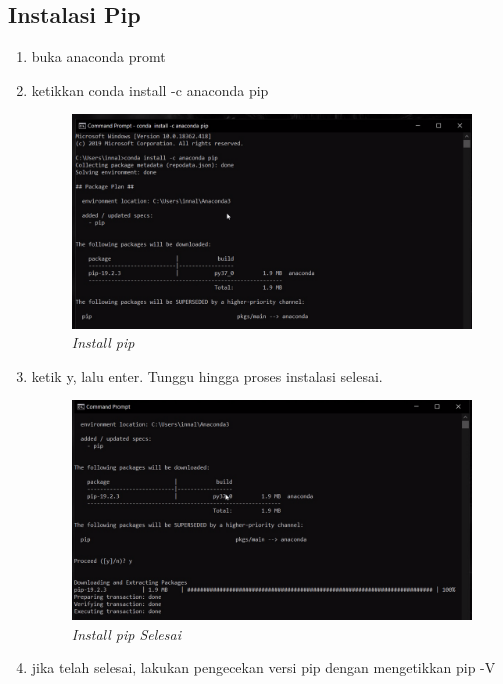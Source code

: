 \subsection{Instalasi Pip}
\begin{enumerate}
\item buka anaconda promt
\item ketikkan conda install -c anaconda pip
\begin{figure}[H]
    \centering
    \includegraphics[scale=0.5]{figures/installpip}
    \caption{\textit{Install pip}}
    \label{Figureanaconda70}
\end{figure}
\item ketik y, lalu enter. Tunggu hingga proses instalasi selesai.
\begin{figure}[H]
    \centering
    \includegraphics[scale=0.5]{figures/pipselesai}
    \caption{\textit{Install pip Selesai}}
    \label{Figureanaconda70}
\end{figure}
\item jika telah selesai, lakukan pengecekan versi pip dengan mengetikkan pip -V
\begin{figure}[H]
    \centering

\end{figure}
\end{enumerate}
